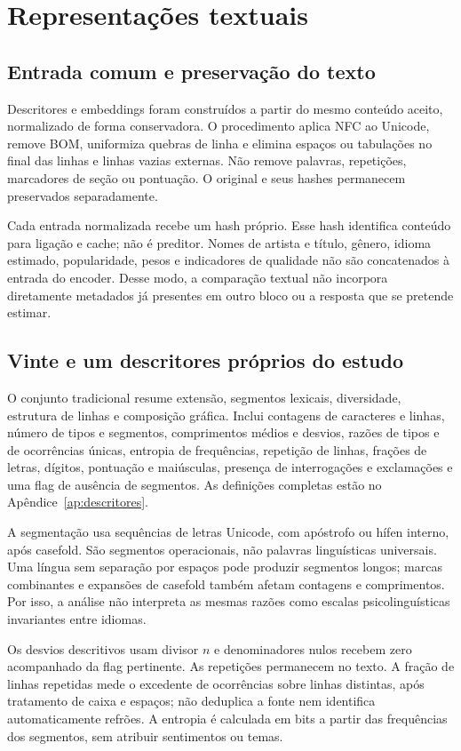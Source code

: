 \chapter{Representações textuais}\label{cap:representacoes}
\section{Entrada comum e preservação do texto}
Descritores e embeddings foram construídos a partir do mesmo conteúdo aceito, normalizado de forma conservadora. O procedimento aplica NFC ao Unicode, remove BOM, uniformiza quebras de linha e elimina espaços ou tabulações no final das linhas e linhas vazias externas. Não remove palavras, repetições, marcadores de seção ou pontuação. O original e seus hashes permanecem preservados separadamente.

Cada entrada normalizada recebe um hash próprio. Esse hash identifica conteúdo para ligação e cache; não é preditor. Nomes de artista e título, gênero, idioma estimado, popularidade, pesos e indicadores de qualidade não são concatenados à entrada do encoder. Desse modo, a comparação textual não incorpora diretamente metadados já presentes em outro bloco ou a resposta que se pretende estimar.

\section{Vinte e um descritores próprios do estudo}
O conjunto tradicional resume extensão, segmentos lexicais, diversidade, estrutura de linhas e composição gráfica. Inclui contagens de caracteres e linhas, número de tipos e segmentos, comprimentos médios e desvios, razões de tipos e de ocorrências únicas, entropia de frequências, repetição de linhas, frações de letras, dígitos, pontuação e maiúsculas, presença de interrogações e exclamações e uma flag de ausência de segmentos. As definições completas estão no Apêndice~\ref{ap:descritores}.

A segmentação usa sequências de letras Unicode, com apóstrofo ou hífen interno, após casefold. São segmentos operacionais, não palavras linguísticas universais. Uma língua sem separação por espaços pode produzir segmentos longos; marcas combinantes e expansões de casefold também afetam contagens e comprimentos. Por isso, a análise não interpreta as mesmas razões como escalas psicolinguísticas invariantes entre idiomas.

Os desvios descritivos usam divisor $n$ e denominadores nulos recebem zero acompanhado da flag pertinente. As repetições permanecem no texto. A fração de linhas repetidas mede o excedente de ocorrências sobre linhas distintas, após tratamento de caixa e espaços; não deduplica a fonte nem identifica automaticamente refrões. A entropia é calculada em bits a partir das frequências dos segmentos, sem atribuir sentimentos ou temas.

